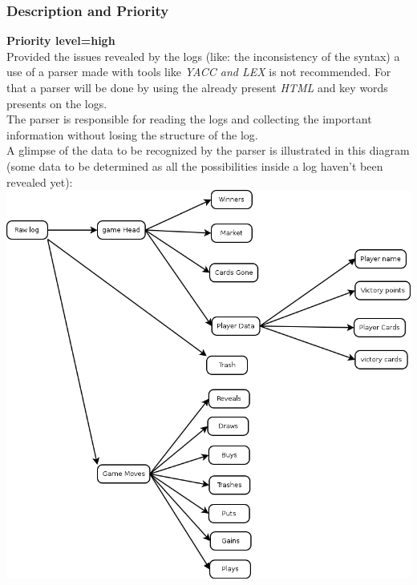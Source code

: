 \documentclass{scrreprt}
\begin{document}
\subsubsection{Description and Priority}
\textbf{Priority level=high}\\
Provided the issues revealed by the logs (like: the inconsistency of the syntax)
a use of a parser made with tools like \textit{YACC and LEX} is not recommended.
For that a parser will be done by using the already present \textit{HTML} and
key words presents on the logs.\\
The parser is responsible for reading the logs and collecting the important
information without losing the structure of the log.\\
A glimpse of the data to be recognized by the parser is illustrated in this
diagram (some data to be determined as all the possibilities inside a log
haven't been revealed yet):\\
\includegraphics[scale=0.35,keepaspectratio]{UseCaseParser}
\end{document}
